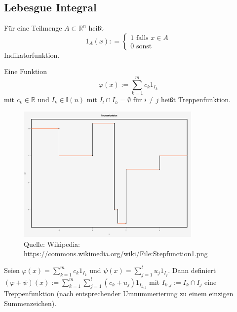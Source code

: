 \subsection{Lebesgue Integral}

\begin{Definition}
Für eine Teilmenge $A \subset \mathbb{R}^n$ heißt
$$ 1_A (x): = \begin{cases} 1 \text{  falls }   x \in A  \\  0  \text{  sonst}  \end{cases}$$
Indikatorfunktion.
\end{Definition}

\begin{Definition}
Eine Funktion 
$$ \varphi(x) := \sum_{k=1}^m c_k 1_{I_k}$$ mit $c_k \in \mathbb{R}$ und $I_k \in \mathbb{I}(n)$ mit $I_l \cap I_h = \emptyset$ für $i \neq j$
heißt Treppenfunktion.
\end{Definition}

\begin{figure}[H]
      \centering
    \includegraphics[width=0.8\textwidth]{images/640px-Stepfunction1}
      \caption{Quelle: Wikipedia: https://commons.wikimedia.org/wiki/File:Stepfunction1.png}

\end{figure}



\begin{Bemerkung}
Seien $\varphi(x) =   \sum_{k=1}^m  c_k 1_{I_k}$ und $\psi(x) =  \sum_{j=1}^l  u_j 1_{I_j}$. Dann definiert
$(\varphi + \psi)(x) := \sum_{k=1}^m \sum_{j=1}^l   (c_k + u_j) 1_{I_{k,j}}$ mit $I_{k,j}:= I_k \cap I_j$ eine Treppenfunktion (nach entsprechender Umnummerierung zu einem einzigen Summenzeichen).
\end{Bemerkung}


